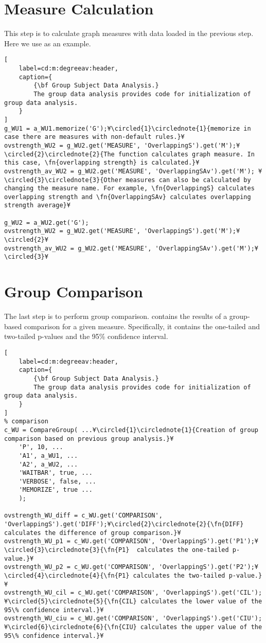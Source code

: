 \documentclass{tufte-handout}
\begin{document}
\section{Measure Calculation}
This step is to calculate graph measures with data loaded in the previous step. Here we use  as an example.
\begin{lstlisting}[
	label=cd:m:degreeav:header,
	caption={
		{\bf Group Subject Data Analysis.}
		The group data analysis provides code for initialization of group data analysis.
	}
]
g_WU1 = a_WU1.memorize('G');¥\circled{1}\circlednote{1}{memorize in case there are measures with non-default rules.}¥
ovstrength_WU2 = g_WU2.get('MEASURE', 'OverlappingS').get('M');¥\circled{2}\circlednote{2}{The function calculates graph measure. In this case, \fn{overlapping strength} is calculated.}¥
ovstrength_av_WU2 = g_WU2.get('MEASURE', 'OverlappingSAv').get('M'); ¥\circled{3}\circlednote{3}{Other measures can also be calculated by changing the measure name. For example, \fn{OverlappingS} calculates overlapping strength and \fn{OverlappingSAv} calculates overlapping strength average}¥

g_WU2 = a_WU2.get('G');
ovstrength_WU2 = g_WU2.get('MEASURE', 'OverlappingS').get('M');¥\circled{2}¥
ovstrength_av_WU2 = g_WU2.get('MEASURE', 'OverlappingSAv').get('M');¥\circled{3}¥
\end{lstlisting}


\clearpage
\section{Group Comparison}
The last step is to perform group comparison.  contains the results of a group-based comparison for a given measure.
Specifically, it contains the one-tailed and two-tailed p-values and the 95\% confidence interval.
\begin{lstlisting}[
	label=cd:m:degreeav:header,
	caption={
		{\bf Group Subject Data Analysis.}
		The group data analysis provides code for initialization of group data analysis.
	}
]
% comparison
c_WU = CompareGroup( ...¥\circled{1}\circlednote{1}{Creation of group comparison based on previous group analysis.}¥
    'P', 10, ...
    'A1', a_WU1, ...
    'A2', a_WU2, ...
    'WAITBAR', true, ...
    'VERBOSE', false, ...
    'MEMORIZE', true ...
    );

ovstrength_WU_diff = c_WU.get('COMPARISON', 'OverlappingS').get('DIFF');¥\circled{2}\circlednote{2}{\fn{DIFF} calculates the difference of group comparison.}¥
ovstrength_WU_p1 = c_WU.get('COMPARISON', 'OverlappingS').get('P1');¥\circled{3}\circlednote{3}{\fn{P1}  calculates the one-tailed p-value.}¥
ovstrength_WU_p2 = c_WU.get('COMPARISON', 'OverlappingS').get('P2');¥\circled{4}\circlednote{4}{\fn{P1} calculates the two-tailed p-value.}¥
ovstrength_WU_cil = c_WU.get('COMPARISON', 'OverlappingS').get('CIL');¥\circled{5}\circlednote{5}{\fn{CIL} calculates the lower value of the 95\% confidence interval.}¥
ovstrength_WU_ciu = c_WU.get('COMPARISON', 'OverlappingS').get('CIU');¥\circled{6}\circlednote{6}{\fn{CIU} calculates the upper value of the 95\% confidence interval.}¥
\end{lstlisting}


\end{document}
